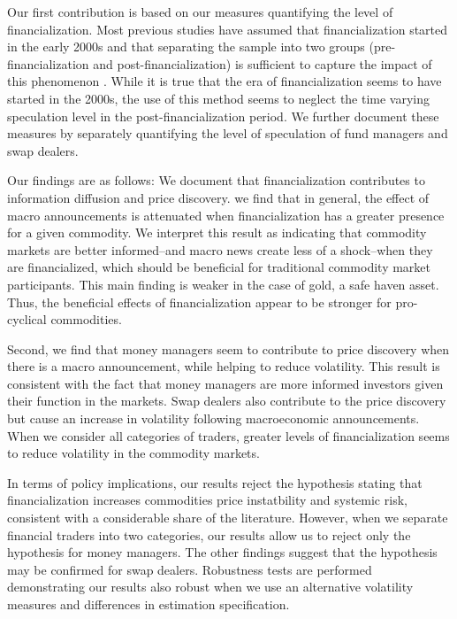 \documentclass[12pt]{article}
\begin{document}
Our first contribution is based on our measures quantifying the level of financialization. Most previous studies have assumed that financialization started in the early 2000s and that separating the sample into two groups (pre-financialization and post-financialization) is sufficient to capture the impact of this phenomenon \citep{buyukcsahin2010matters, kilian2014role,brunetti2016speculators,irwin2012financialization,stoll2010commodity,alquist2013role}
. While it is true that the era of financialization seems to have started in the 2000s, the use of this method seems to neglect the time varying speculation level in the post-financialization period. We further document these measures by separately quantifying the level of speculation of fund managers and swap dealers.

 Our findings are as follows: We document that financialization contributes to information diffusion and price discovery. we find that in general, the effect of macro announcements is attenuated when financialization has a greater presence for a given commodity. We interpret this result as indicating that commodity markets are better informed–and macro news create less of a shock–when they are financialized, which should be beneficial for traditional commodity market participants. This main finding is weaker in the case of gold, a safe haven asset. Thus, the beneficial effects of financialization appear to be stronger for pro-cyclical commodities.

Second, we find that money managers seem to contribute to price discovery when there is a macro announcement, while helping to reduce volatility. This result is consistent with the fact that money managers are more informed investors given their function in the markets. Swap dealers also contribute to the price discovery but  cause an increase in volatility following macroeconomic announcements. When we consider all categories of traders, greater levels of financialization seems to reduce  volatility in the commodity markets. 

In terms of policy implications, our results reject the \citet{masters2009testimony} hypothesis stating that financialization increases commodities price instatbility and systemic risk, consistent with a considerable share of the literature. However, when we separate financial traders into two categories, our results allow us to reject only the \citet{masters2009testimony} hypothesis for money managers. The other findings suggest that the \citet{masters2009testimony} hypothesis may be confirmed for swap dealers. Robustness tests are performed demonstrating our results also robust when we use an alternative volatility measures and differences in estimation specification.
\end{document}

